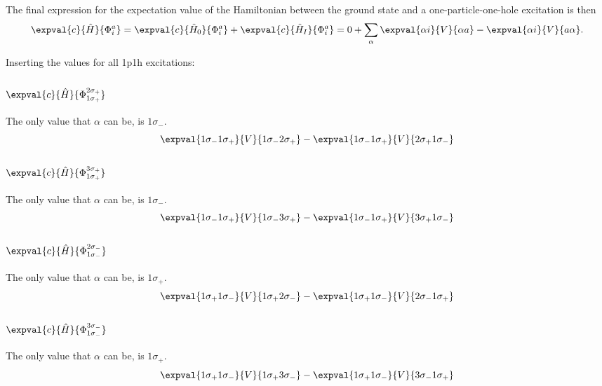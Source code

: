 The final expression for the expectation value of the Hamiltonian between the ground state and a one-particle-one-hole excitation is then
\begin{equation*}
    \expval{c}{\hat{H}}{\Phi_i^a} = \expval{c}{\hat{H}_0}{\Phi_i^a} + \expval{c}{\hat{H}_I}{\Phi_i^a} = 0 + \sum_{\alpha} \expval{\alpha i}{V}{\alpha a} - \expval{\alpha i}{V}{a \alpha}.
\end{equation*}

Inserting the values for all 1p1h excitations:

\subsubsection{$\expval{c}{\hat{H}}{\Phi_{1\sigma_{+}}^{2\sigma_{+}}}$} %
The only value that $\alpha$ can be, is $1\sigma_{-}$.
\begin{equation*}
    \expval{1\sigma_{-} 1\sigma_{+}}{V}{1\sigma_{-} 2\sigma_{+}} - \expval{1\sigma_{-} 1\sigma_{+}}{V}{2\sigma_{+} 1\sigma_{-}}
\end{equation*}

\subsubsection{$\expval{c}{\hat{H}}{\Phi_{1\sigma_{+}}^{3\sigma_{+}}}$} %
The only value that $\alpha$ can be, is $1\sigma_{-}$.
\begin{equation*}
    \expval{1\sigma_{-} 1\sigma_{+}}{V}{1\sigma_{-} 3\sigma_{+}} - \expval{1\sigma_{-} 1\sigma_{+}}{V}{3\sigma_{+} 1\sigma_{-}}
\end{equation*}

\subsubsection{$\expval{c}{\hat{H}}{\Phi_{1\sigma_{-}}^{2\sigma_{-}}}$} %
The only value that $\alpha$ can be, is $1\sigma_{+}$.
\begin{equation*}
    \expval{1\sigma_{+} 1\sigma_{-}}{V}{1\sigma_{+} 2\sigma_{-}} - \expval{1\sigma_{+} 1\sigma_{-}}{V}{2\sigma_{-} 1\sigma_{+}}
\end{equation*}

\subsubsection{$\expval{c}{\hat{H}}{\Phi_{1\sigma_{-}}^{3\sigma_{-}}}$} %
The only value that $\alpha$ can be, is $1\sigma_{+}$.
\begin{equation*}
    \expval{1\sigma_{+} 1\sigma_{-}}{V}{1\sigma_{+} 3\sigma_{-}} - \expval{1\sigma_{+} 1\sigma_{-}}{V}{3\sigma_{-} 1\sigma_{+}}
\end{equation*}

